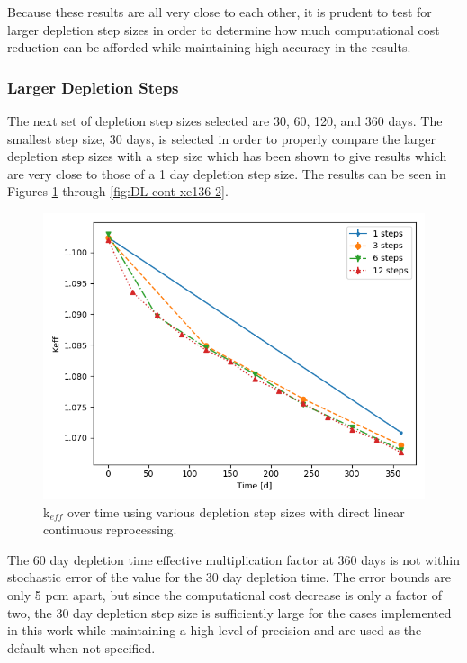 Because these results are all very close to each other, it is prudent to test for larger depletion step sizes in order to determine how much computational cost reduction can be afforded while maintaining high accuracy in the results.

\subsubsection{Larger Depletion Steps}

The next set of depletion step sizes selected are 30, 60, 120, and 360 days. The smallest step size, 30 days, is selected in order to properly compare the larger depletion step sizes with a step size which has been shown to give results which are very close to those of a 1 day depletion step size. The results can be seen in Figures \ref{fig:DL-cont-k-2} through \ref{fig:DL-cont-xe136-2}. 

\begin{figure}[H]
  \centering
  \includegraphics[scale=0.5]{images/DL_NSTEP_keff-large.png}
  \caption{k$_{eff}$ over time using various depletion step sizes with direct linear continuous reprocessing.}
   \label{fig:DL-cont-k-2}
\end{figure}

The 60 day depletion time effective multiplication factor at 360 days is not within stochastic error of the value for the 30 day depletion time. The error bounds are only 5 pcm apart, but since the computational cost decrease is only a factor of two, the 30 day depletion step size is sufficiently large for the cases implemented in this work while maintaining a high level of precision and are used as the default when not specified.


